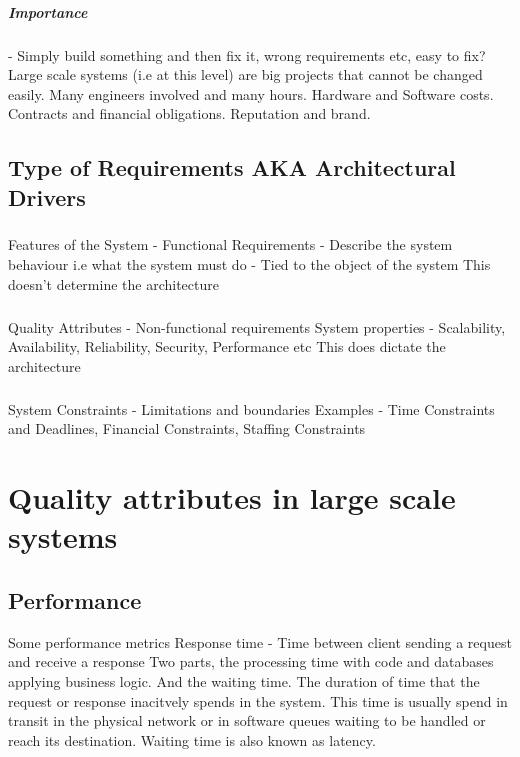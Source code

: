 \documentclass[a4paper, 11pt]{book}
\begin{document}
    \paragraph{Importance} - Simply build something and then fix it, wrong requirements etc, easy to fix?
    Large scale systems (i.e at this level) are big projects that cannot be changed easily.
    Many engineers involved and many hours.
    Hardware and Software costs.
    Contracts and financial obligations.
    Reputation and brand.


    \section{Type of Requirements AKA Architectural Drivers}

    \paragraph{}
    Features of the System - Functional Requirements - Describe the system behaviour i.e what the system must do - Tied to the object of the system
    This doesn't determine the architecture

    \paragraph{}
    Quality Attributes - Non-functional requirements
    System properties - Scalability, Availability, Reliability, Security, Performance etc
    This does dictate the architecture

    \paragraph{}
    System Constraints - Limitations and boundaries
    Examples - Time Constraints and Deadlines, Financial Constraints, Staffing Constraints


    \chapter{Quality attributes in large scale systems}


    \section{Performance}
    Some performance metrics
    Response time - Time between client sending a request and receive a response
    Two parts, the processing time with code and databases applying business logic.
    And the waiting time.
    The duration of time that the request or response inacitvely spends in the system.
    This time is usually spend in transit in the physical network or in software queues waiting to be handled or reach its destination.
    Waiting time is also known as latency.
\end{document}
